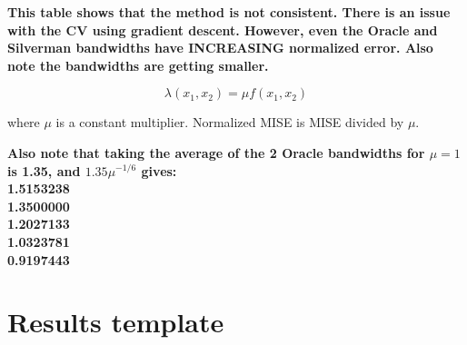 \textbf{
\color{red}
This table shows that the method is not consistent.
There is an issue with the CV using gradient descent.
However, even the Oracle and Silverman bandwidths have INCREASING normalized error.
Also note the bandwidths are getting smaller.
}

$$
\lambda(x_1, x_2) = \mu f\!(x_1, x_2)
$$

where $\mu$ is a constant multiplier.
Normalized MISE is MISE divided by $\mu$.

\textbf{
    \color{red}
    Also note that taking the average of the 2 Oracle bandwidths for $\mu=1$ is 1.35,
    and $1.35 \mu^{-1/6}$ gives:
    \\
    1.5153238 \\
    1.3500000 \\
    1.2027133 \\
    1.0323781 \\
    0.9197443
}


\section*{Results template}
\label{sec:results:template}
\graphicspath{{./results/unif_100_1.0_1h/}}
\makeatletter
{}
\makeatother

